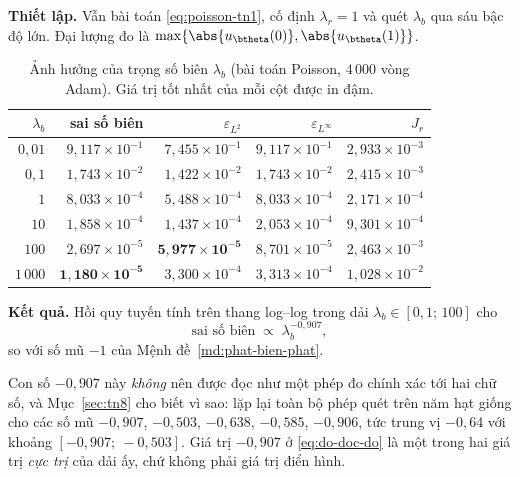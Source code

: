 \textbf{Thiết lập.} Vẫn bài toán \eqref{eq:poisson-tn1}, cố định
$\lambda_r = 1$ và quét $\lambda_b$ qua sáu bậc độ lớn. Đại lượng đo là
$\max\{\abs{u_{\btheta}(0)}, \abs{u_{\btheta}(1)}\}$.
 
\begin{table}[H]
\centering
\caption{Ảnh hưởng của trọng số biên $\lambda_b$ (bài toán Poisson, $4\,000$ vòng
Adam). Giá trị tốt nhất của mỗi cột được in đậm.}
\label{tab:tn2}
\small
\begin{tabular}{@{}rrrrr@{}}
\toprule
$\lambda_b$ & sai số biên & $\varepsilon_{L^2}$ & $\varepsilon_{L^{\infty}}$
& $J_r$ \\
\midrule
$0{,}01$ & $9{,}117\times10^{-1}$ & $7{,}455\times10^{-1}$
         & $9{,}117\times10^{-1}$ & $2{,}933\times10^{-3}$ \\
$0{,}1$  & $1{,}743\times10^{-2}$ & $1{,}422\times10^{-2}$
         & $1{,}743\times10^{-2}$ & $2{,}415\times10^{-3}$ \\
$1$      & $8{,}033\times10^{-4}$ & $5{,}488\times10^{-4}$
         & $8{,}033\times10^{-4}$ & $2{,}171\times10^{-4}$ \\
$10$     & $1{,}858\times10^{-4}$ & $1{,}437\times10^{-4}$
         & $2{,}053\times10^{-4}$ & $9{,}301\times10^{-4}$ \\
$100$    & $2{,}697\times10^{-5}$ & $\mathbf{5{,}977\times10^{-5}}$
         & $8{,}701\times10^{-5}$ & $2{,}463\times10^{-3}$ \\
$1\,000$ & $\mathbf{1{,}180\times10^{-5}}$ & $3{,}300\times10^{-4}$
         & $3{,}313\times10^{-4}$ & $1{,}028\times10^{-2}$ \\
\bottomrule
\end{tabular}
\end{table}
 
\textbf{Kết quả.} Hồi quy tuyến tính trên thang log--log trong dải
$\lambda_b \in [0{,}1;\,100]$ cho
\begin{equation}
\text{sai số biên} \;\propto\; \lambda_b^{-0{,}907},
\label{eq:do-doc-do}
\end{equation}
so với số mũ $-1$ của Mệnh đề~\ref{md:phat-bien-phat}.

Con số $-0{,}907$ này \emph{không} nên được đọc như một phép đo chính xác tới hai
chữ số, và Mục~\ref{sec:tn8} cho biết vì sao: lặp lại toàn bộ phép quét trên năm
hạt giống cho các số mũ $-0{,}907$, $-0{,}503$, $-0{,}638$, $-0{,}585$,
$-0{,}906$, tức trung vị $-0{,}64$ với khoảng $[-0{,}907;\ -0{,}503]$. Giá trị
$-0{,}907$ ở \eqref{eq:do-doc-do} là một trong hai giá trị \emph{cực trị} của
dải ấy, chứ không phải giá trị điển hình.

